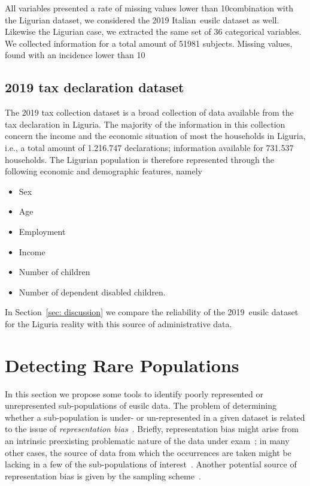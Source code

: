 All variables presented a rate of missing values lower than 10\In combination with the Ligurian dataset, we considered the 2019 Italian~\gls{eusilc} dataset as well.
Likewise the Ligurian case, we extracted the same set of 36 categorical variables.
We collected information for a total amount of 51981 subjects. 
Missing values, found with an incidence lower than 10\
\subsection{2019 tax declaration dataset}\label{sec: data_taxt_decalration}
The 2019 tax collection dataset is a broad collection of data available from the tax declaration in Liguria.
The majority of the information in this collection concern the income and the economic situation of most the households in Liguria, i.e., a total amount of 1.216.747 declarations; information available for 731.537 households.
The Ligurian population is therefore represented through the following economic and demographic features, namely
\begin{itemize}
    \item Sex
    \item Age
    \item Employment
    \item Income
    \item Number of children
    \item Number of dependent disabled children.
\end{itemize}
In Section~\ref{sec: discussion} we compare the reliability of the 2019~\gls{eusilc} dataset for the Liguria reality with this source of administrative data.

\section{Detecting Rare Populations}\label{sec: methodology}
In this section we propose some tools to identify poorly represented or unrepresented sub-populations of \gls{eusilc} data. 
The problem of determining whether a sub-population is under- or un-represented in a given dataset is related to the issue of \emph{representation bias}~\cite[]{shahbazi2022survey}. 
Briefly, representation bias might arise from an intrinsic preexisting problematic nature of the data under exam~\cite[]{mehrabi2021survey}; in many other cases, the source of data from which the occurrences are taken might be lacking in a few of the sub-populations of interest~\cite[]{shahbazi2022survey}.
Another potential source of representation bias is given by the sampling scheme~\cite[]{shahbazi2022survey}.

